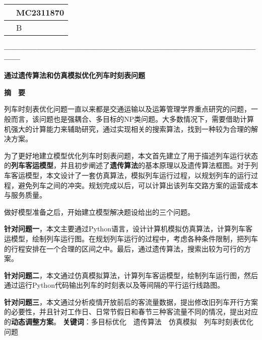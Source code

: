 \thispagestyle{empty}   %

\begin{table}[h]
    \centering
    \renewcommand\arraystretch{2}
    \begin{tabular}{|l|l|}
    \hline
    \quad & MC2311870\quad \\ \hline
       & B         \\ \hline
    \end{tabular}
\end{table}



\begin{center}
    \textbf{—————————————————————————————————}

    \textbf{\fontsize{20}{1.5}通过遗传算法和仿真模拟优化列车时刻表问题}

    \textbf{摘　要}
\end{center}





%
%

列车时刻表优化问题一直以来都是交通运输以及运筹管理学界重点研究的问题，一般而言，该问题也是强耦合、多目标的NP类问题。大多数情况下，需要借助计算机强大的计算能力来辅助研究，通过实现相关的搜索算法，找到一种较为合理的解决方案\cite{niuGuidaoliecheshikebiaowentiyanjiuzongshu2021}。

为了更好地建立模型优化列车时刻表问题，本文首先建立了用于描述列车运行状态的\textbf{列车客运模型}，并且初步阐述了\textbf{遗传算法}的基本原理以及遗传算法框图。对于列车客运模型，本文设计了一套仿真算法，模拟列车运行过程，以规划列车的运行过程，避免列车之间的冲突。规划完成以后，可以计算出该列车交路方案的运营成本与服务质量。

做好模型准备之后，开始建立模型解决题设给出的三个问题。

\textbf{针对问题一}，本文主要通过Python语言，设计计算机模拟仿真算法，计算列车客运模型，绘制列车运行图。在规划列车运行的过程中，考虑各种条件限制，把列车的行程安排在一个合理的区间之中。最后，通过遗传算法，搜索出较为可行的方案。

\textbf{针对问题二}，本文通过仿真模拟算法，计算列车客运模型，绘制列车运行图，然后通过运行Python代码输出列车的时刻表以及等间隔的平行运行线路图。


\textbf{针对问题三}，本文通过分析疫情开放前后的客流量数据，提出修改旧列车开行方案的必要性，并且针对工作日、日常节假日和春节三种客流量不同的情况，提出对应的\textbf{动态调整方案}。\newline
\newline
\newline
\textbf{关键词}：多目标优化　遗传算法　仿真模拟　列车时刻表优化问题




%
%

\newpage
\tableofcontents
\thispagestyle{empty}